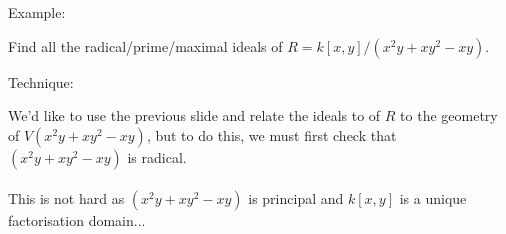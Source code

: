 \documentclass{beamer}
\begin{document}
\begin{frame}{Example:}

Find all the radical/prime/maximal ideals of $R=k[x,y]/(x^2y+xy^2-xy)$.

\begin{block}{Technique:}

We'd like to use the previous slide and relate the ideals to of $R$ to the geometry of $V(x^2y+xy^2-xy)$, but to do this, we must first check that $(x^2y+xy^2-xy)$ is radical. \\~\\

This is not hard as $(x^2y+xy^2-xy)$ is principal and $k[x,y]$ is a unique factorisation domain... 

\end{block}

\end{frame}
\end{document}
